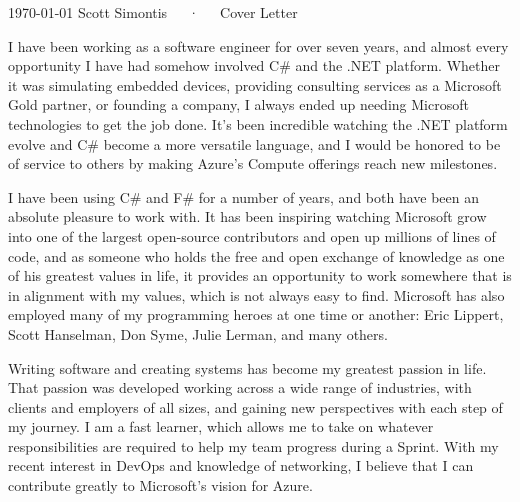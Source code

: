 \documentclass[11pt, letterpaper]{awesome-cv}
\begin{document}
\makecvheader[R]

\makecvfooter
  {\today}
  {Scott Simontis~~~·~~~Cover Letter}
  {}

\makelettertitle

\begin{cvletter}

I have been working as a software engineer for over seven years, and almost every opportunity I have had somehow involved C\# and the .NET platform. Whether it was simulating embedded devices, providing consulting services as a Microsoft Gold partner, or founding a company, I always ended up needing Microsoft technologies to get the job done. It's been incredible watching the .NET platform evolve and C\# become a more versatile language, and I would be honored to be of service to others by making Azure's Compute offerings reach new milestones.

I have been using C\# and F\# for a number of years, and both have been an absolute pleasure to work with. It has been inspiring watching Microsoft grow into one of the largest open-source contributors and open up millions of lines of code, and as someone who holds the free and open exchange of knowledge as one of his greatest values in life, it provides an opportunity to work somewhere that is in alignment with my values, which is not always easy to find. Microsoft has also employed many of my programming heroes at one time or another: Eric Lippert, Scott Hanselman, Don Syme, Julie Lerman, and many others.

Writing software and creating systems has become my greatest passion in life. That passion was developed working across a wide range of industries, with clients and employers of all sizes, and gaining new perspectives with each step of my journey. I am a fast learner, which allows me to take on whatever responsibilities are required to help my team progress during a Sprint. With my recent interest in DevOps and knowledge of networking, I believe that I can contribute greatly to Microsoft's vision for Azure.

\end{cvletter}


\makeletterclosing
\end{document}
